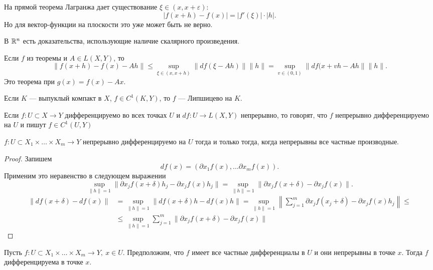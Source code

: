 \begin{note}
    На прямой теорема Лагранжа дает существование $ \xi \in (x, x+ \varepsilon )$: 
    \[
	\lvert f(x+h) - f(x) \rvert = |f'(\xi)| \cdot |h|
    .\] 
    Но для вектор-функции на плоскости это уже может быть не верно.
\end{note}
\begin{note}
    В $ \mathbb{R}^{n}  $ есть доказательства, использующие наличие скалярного произведения.
\end{note}
\begin{cor}
    Если $ f$ из теоремы и  $ A \in L(X, Y)$, то
    \[
	\| f(x + h) - f(x) - Ah\|  \le  \sup_{ \xi \in (x, x+h)} \| df( \xi -Ah) \| \| h \| = \sup_{v \in (0, 1)} \|  df(x+ v h - Ah \| \| h \|  
    .\] 
    Это теорема при $ g(x ) = f(x) - Ax$.
\end{cor}
\begin{cor}
    Если $ K$ --- выпуклый компакт в  $ X$,  $ f \in C^1(K, Y)$, то $ f$ --- Липшицево на $ K$.
\end{cor}
\begin{defn}
    Если $ f \colon U \subset X \to  Y$ дифференцируемо во всех точках $ U$ и  $ df \colon U \to  L(X, Y)$ непрерывно, то говорят, что $ f$  {\sf непрерывно дифференцируемо} на $ U$ и пишут  $ f \in C^{1}(U, Y)$  
\end{defn}
\begin{note}
    $ f \colon U \subset X_1 \times \ldots \times X_m \to  Y$ непрерывно дифференцируемо на $ U$ тогда и только тогда, когда непрерывны все частные производные.
\end{note}
\begin{proof}
    Запишем 
    \[
	df(x) = \left( \partial x_1f(x), \ldots \partial x_m f(x) \right) 
    .\] 
    Применим это неравенство в следующем выражении
    \[
	\sup_{\| h \| =1} \| \partial x_j f(x+\delta ) h_j - \partial x_j f(x)h_j \| = \sup_{\| h \| =1} \| \partial x_jf(x+\delta ) - \partial x_jf(x) \| 
    .\] 
    \[
    \begin{aligned}
	\| df(x+\delta ) - df(x) \| &= \sup_{\|  h \| =1} \| df(x+ \delta)h - df(x)h  \| = \sup_{\| h \| =1}\left\|\sum_{j=1}^{m}\partial x_jf(x_j+\delta ) - \partial x_jf(x)h_j\right\| \le \\
				    &\le  \sup_{\| h \| =1} \sum_{j=1}^{m} \| \partial x_jf(x+\delta ) - \partial x_jf(x) \| 
    \end{aligned}
    \]
\end{proof}
\begin{thm}
    Пусть $ f \colon U \subset X_1 \times \ldots \times X_m \to  Y, ~ x \in U$. Предположим, что $ f$ имеет все частные дифференциалы в  $ U$ и они непрерывны в точке  $ x$. Тогда  $ f$ дифференцируема в точке  $ x$.
\end{thm}
